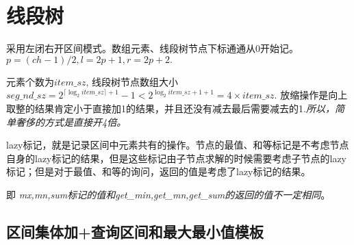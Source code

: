 \section{线段树}
	\par 采用左闭右开区间模式。数组元素、线段树节点下标通通从0开始记。$p=(ch-1)/2, l=2p+1, r=2p+2.$
	\par 元素个数为$item\_sz$, 线段树节点数组大小$seg\_nd\_sz=2^{{\lceil \log_2{item\_sz}  \rceil} + 1}-1 < 2^{\log_2{item\_sz} + 1 + 1} = 4 \times item\_sz$. 放缩操作是向上取整的结果肯定小于直接加1的结果，并且还没有减去最后需要减去的1.\textit{所以，简单奢侈的方式是直接开4倍。}
	\par lazy标记，就是记录区间中元素共有的操作。节点的最值、和等标记是不考虑节点自身的lazy标记的结果，但是这些标记由子节点求解的时候需要考虑子节点的lazy标记；但是对于最值、和等的询问，返回的值是考虑了lazy标记的结果。
	\par 即\textit{ mx,mn,sum标记的值和get\_min,get\_mn,get\_sum的返回的值不一定相同}。
	\subsection{区间集体加+查询区间和最大最小值模板}


